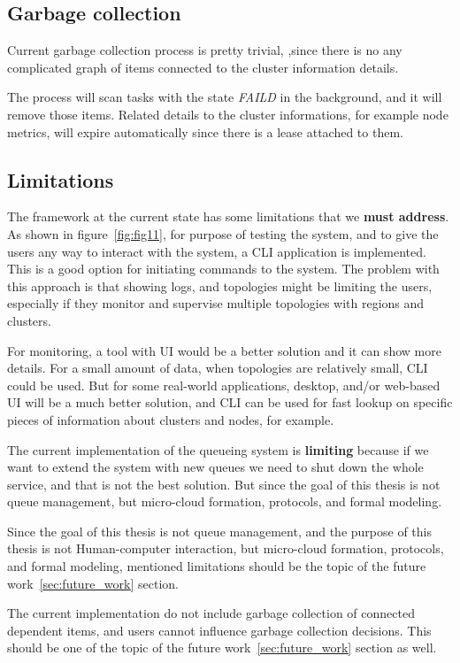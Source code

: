 \subsection{Garbage collection}\label{sec:gc}
%
Current garbage collection process is pretty trivial, ,since there is no any complicated graph of items connected to the cluster information details.

The process will scan tasks with the state \emph{FAILD} in the background, and it will remove those items. Related details to the cluster informations, for example node metrics, will expire automatically since there is a lease attached to them.
%
%
\subsection{Limitations}\label{sec:framework_limits}
% 
The framework at the current state has some limitations that we \textbf{must address}. As shown in figure~\ref{fig:fig11}, for purpose of testing the system, and to give the users any way to interact with the system, a CLI application is implemented. This is a good option for initiating commands to the system. The problem with this approach is that showing logs, and topologies might be limiting the users, especially if they monitor and supervise multiple topologies with regions and clusters.

For monitoring, a tool with UI would be a better solution and it can show more details. For a small amount of data, when topologies are relatively small, CLI could be used. But for some real-world applications, desktop, and/or web-based UI will be a much better solution, and CLI can be used for fast lookup on specific pieces of information about clusters and nodes, for example.

The current implementation of the queueing system is \textbf{limiting} because if we want to extend the system with new queues we need to shut down the whole service, and that is not the best solution. But since the goal of this thesis is not queue management, but micro-cloud formation, protocols, and formal modeling.

Since the goal of this thesis is not queue management, and the purpose of this thesis is not Human-computer interaction, but micro-cloud formation, protocols, and formal modeling, mentioned limitations should be the topic of the future work~\ref{sec:future_work} section.

The current implementation do not include garbage collection of connected dependent items, and users cannot influence garbage collection decisions. This should be one of the topic of the future work~\ref{sec:future_work} section as well.
%
%
